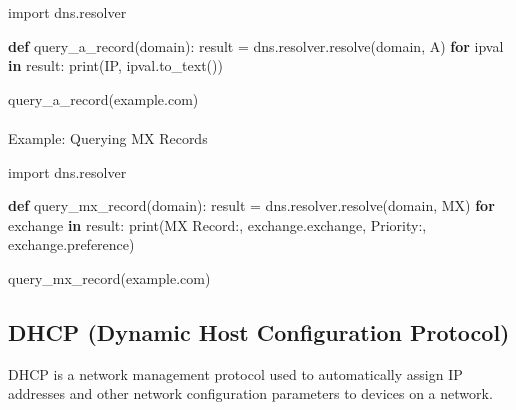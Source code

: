\documentclass[
  letterpaper,
  DIV=11,
  numbers=noendperiod]{scrreprt}
\makeatletter
\let\oldparagraph\paragraph
\renewcommand{\paragraph}{
    \@ifstar
      \xxxParagraphStar
      \xxxParagraphNoStar
  }
\newcommand{\xxxParagraphStar}[1]{\oldparagraph*{#1}\mbox{}}
\newcommand{\xxxParagraphNoStar}[1]{\oldparagraph{#1}\mbox{}}
\newenvironment{Shaded}{\begin{snugshade}}{\end{snugshade}}
\newcommand{\BuiltInTok}[1]{\textcolor[rgb]{0.00,0.23,0.31}{#1}}
\newcommand{\ControlFlowTok}[1]{\textcolor[rgb]{0.00,0.23,0.31}{\textbf{#1}}}
\newcommand{\ImportTok}[1]{\textcolor[rgb]{0.00,0.46,0.62}{#1}}
\newcommand{\KeywordTok}[1]{\textcolor[rgb]{0.00,0.23,0.31}{\textbf{#1}}}
\newcommand{\NormalTok}[1]{\textcolor[rgb]{0.00,0.23,0.31}{#1}}
\newcommand{\OperatorTok}[1]{\textcolor[rgb]{0.37,0.37,0.37}{#1}}
\newcommand{\StringTok}[1]{\textcolor[rgb]{0.13,0.47,0.30}{#1}}
\makeatother
\begin{document}
\begin{Shaded}
\begin{Highlighting}[]
\ImportTok{import}\NormalTok{ dns.resolver}

\KeywordTok{def}\NormalTok{ query\_a\_record(domain):}
\NormalTok{    result }\OperatorTok{=}\NormalTok{ dns.resolver.resolve(domain, }\StringTok{\textquotesingle{}A\textquotesingle{}}\NormalTok{)}
    \ControlFlowTok{for}\NormalTok{ ipval }\KeywordTok{in}\NormalTok{ result:}
        \BuiltInTok{print}\NormalTok{(}\StringTok{\textquotesingle{}IP\textquotesingle{}}\NormalTok{, ipval.to\_text())}

\NormalTok{query\_a\_record(}\StringTok{\textquotesingle{}example.com\textquotesingle{}}\NormalTok{)}
\end{Highlighting}
\end{Shaded}

\paragraph{Example: Querying MX
Records}\label{example-querying-mx-records}

\begin{Shaded}
\begin{Highlighting}[]
\ImportTok{import}\NormalTok{ dns.resolver}

\KeywordTok{def}\NormalTok{ query\_mx\_record(domain):}
\NormalTok{    result }\OperatorTok{=}\NormalTok{ dns.resolver.resolve(domain, }\StringTok{\textquotesingle{}MX\textquotesingle{}}\NormalTok{)}
    \ControlFlowTok{for}\NormalTok{ exchange }\KeywordTok{in}\NormalTok{ result:}
        \BuiltInTok{print}\NormalTok{(}\StringTok{\textquotesingle{}MX Record:\textquotesingle{}}\NormalTok{, exchange.exchange, }\StringTok{\textquotesingle{}Priority:\textquotesingle{}}\NormalTok{, exchange.preference)}

\NormalTok{query\_mx\_record(}\StringTok{\textquotesingle{}example.com\textquotesingle{}}\NormalTok{)}
\end{Highlighting}
\end{Shaded}

\subsection{DHCP (Dynamic Host Configuration
Protocol)}\label{dhcp-dynamic-host-configuration-protocol}

DHCP is a network management protocol used to automatically assign IP
addresses and other network configuration parameters to devices on a
network.
\end{document}

